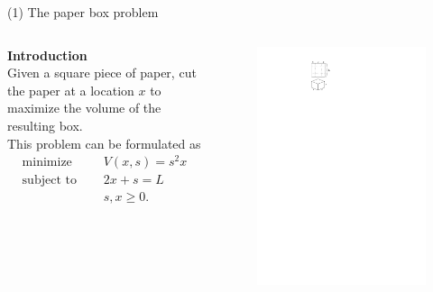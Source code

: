 \documentclass[11pt, aspectratio=149]{beamer}
\theoremstyle{plain}
\begin{document}

\begin{frame}[fragile, t]{(1) The paper box problem}
\begin{columns}
\begin{column}{0.55\textwidth}
\textbf{Introduction}\\ \vspace*{0.5em} 
Given a square piece of paper, cut the paper at a location $x$ to maximize the volume of the resulting box. \\
\vspace*{1em}
This problem can be formulated as
\begin{align*}
\text{minimize } \quad & V(x, s) = s^2 x  \\
\text{subject to } \quad & 2x + s = L \\
& s, x \geq 0.
\end{align*}
\end{column}
\begin{column}{0.45\textwidth}%
	\begin{figure}
		\centering
		\includegraphics[width=0.75\linewidth]{figs/box_opt.pdf}
	\end{figure}
\end{column}
\end{columns}
\end{frame}
\end{document}
